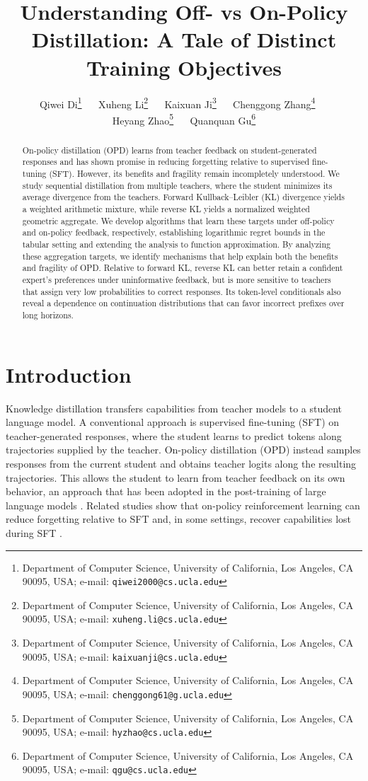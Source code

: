 \documentclass[11pt]{article}
\title{\huge Understanding Off- vs On-Policy Distillation: A Tale of Distinct Training Objectives}
\author{
    Qiwei Di\thanks{Department of Computer Science, University of California, Los Angeles, CA 90095, USA; e-mail: {\tt qiwei2000@cs.ucla.edu}}
    ~~
    Xuheng Li\thanks{Department of Computer Science, University of California, Los Angeles, CA 90095, USA; e-mail: {\tt xuheng.li@cs.ucla.edu}} 
    ~~
    Kaixuan Ji\thanks{Department of Computer Science, University of California, Los Angeles, CA 90095, USA; e-mail: {\tt kaixuanji@cs.ucla.edu}} 
    ~~
    Chenggong Zhang\thanks{Department of Computer Science, University of California, Los Angeles, CA 90095, USA; e-mail: {\tt chenggong61@g.ucla.edu}}
    ~~
    \\
    Heyang Zhao\thanks{Department of Computer Science, University of California, Los Angeles, CA 90095, USA; e-mail: {\tt hyzhao@cs.ucla.edu}} 
    ~~
    Quanquan Gu\thanks{Department of Computer Science, University of California, Los Angeles, CA 90095, USA; e-mail: {\tt qgu@cs.ucla.edu}}
}
\begin{document}
    \date{}
    \maketitle
\begin{abstract}
On-policy distillation (OPD) learns from teacher feedback on student-generated responses and has shown promise in reducing forgetting relative to supervised fine-tuning (SFT). However, its benefits and fragility remain incompletely understood. We study sequential distillation from multiple teachers, where the student minimizes its average divergence from the teachers. Forward Kullback--Leibler (KL) divergence yields a weighted arithmetic mixture, while reverse KL yields a normalized weighted geometric aggregate. We develop algorithms that learn these targets under off-policy and on-policy feedback, respectively, establishing logarithmic regret bounds in the tabular setting and extending the analysis to function approximation. By analyzing these aggregation targets, we identify mechanisms that help explain both the benefits and fragility of OPD. Relative to forward KL, reverse KL can better retain a confident expert's preferences under uninformative feedback, but is more sensitive to teachers that assign very low probabilities to correct responses. Its token-level conditionals also reveal a dependence on continuation distributions that can favor incorrect prefixes over long horizons.
\end{abstract}
\section{Introduction}
Knowledge distillation transfers capabilities from teacher models to a student language model. A conventional approach is supervised fine-tuning (SFT) on teacher-generated responses, where the student learns to predict tokens along trajectories supplied by the teacher. On-policy distillation (OPD) \citep{agarwal2024policy,lu2025onpolicydistillation} instead samples responses from the current student and obtains teacher logits along the resulting trajectories. This allows the student to learn from teacher feedback on its own behavior, an approach that has been adopted in the post-training of large language models \citep{yang2025qwen3,xiao2026mimo,zeng2026glm}. Related studies show that on-policy reinforcement learning can reduce forgetting relative to SFT \citep{shenfeld2026rl,chen2025retaining} and, in some settings, recover capabilities lost during SFT \citep{jin2025rl}. 
\end{document}
